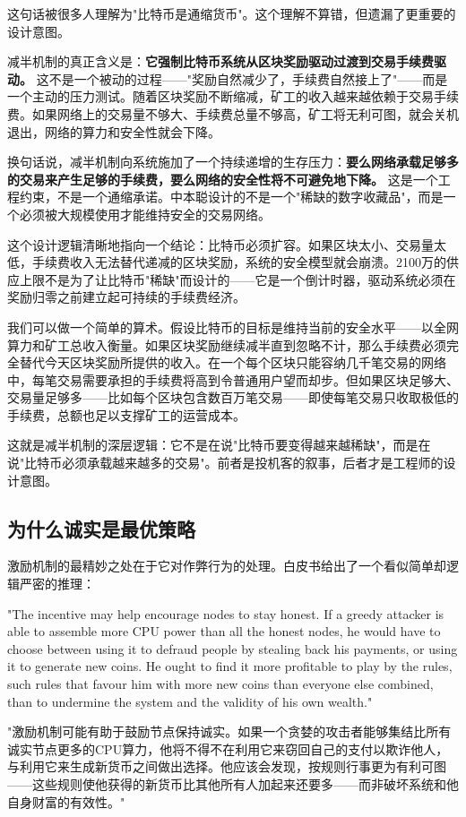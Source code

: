 \documentclass[a4paper,12pt,openany]{ctexbook}
\newenvironment{quoting}{%
  \par\vspace{0.5em}%
  \begin{list}{}{%
    \setlength{\leftmargin}{2em}%
    \setlength{\rightmargin}{2em}%
    \setlength{\parsep}{0.3em}%
    \setlength{\itemsep}{0pt}%
    \setlength{\topsep}{0pt}%
  }%
  \item\relax
}{%
  \end{list}%
  \par\vspace{0.5em}%
}
\begin{document}
这句话被很多人理解为"比特币是通缩货币"。这个理解不算错，但遗漏了更重要的设计意图。

减半机制的真正含义是：\textbf{它强制比特币系统从区块奖励驱动过渡到交易手续费驱动。} 这不是一个被动的过程——"奖励自然减少了，手续费自然接上了"——而是一个主动的压力测试。随着区块奖励不断缩减，矿工的收入越来越依赖于交易手续费。如果网络上的交易量不够大、手续费总量不够高，矿工将无利可图，就会关机退出，网络的算力和安全性就会下降。

换句话说，减半机制向系统施加了一个持续递增的生存压力：\textbf{要么网络承载足够多的交易来产生足够的手续费，要么网络的安全性将不可避免地下降。} 这是一个工程约束，不是一个通缩承诺。中本聪设计的不是一个"稀缺的数字收藏品"，而是一个必须被大规模使用才能维持安全的交易网络。

这个设计逻辑清晰地指向一个结论：比特币必须扩容。如果区块太小、交易量太低，手续费收入无法替代递减的区块奖励，系统的安全模型就会崩溃。2100万的供应上限不是为了让比特币"稀缺"而设计的——它是一个倒计时器，驱动系统必须在奖励归零之前建立起可持续的手续费经济。

我们可以做一个简单的算术。假设比特币的目标是维持当前的安全水平——以全网算力和矿工总收入衡量。如果区块奖励继续减半直到忽略不计，那么手续费必须完全替代今天区块奖励所提供的收入。在一个每个区块只能容纳几千笔交易的网络中，每笔交易需要承担的手续费将高到令普通用户望而却步。但如果区块足够大、交易量足够多——比如每个区块包含数百万笔交易——即使每笔交易只收取极低的手续费，总额也足以支撑矿工的运营成本。

这就是减半机制的深层逻辑：它不是在说"比特币要变得越来越稀缺"，而是在说"比特币必须承载越来越多的交易"。前者是投机客的叙事，后者才是工程师的设计意图。


\subsection*{为什么诚实是最优策略}


激励机制的最精妙之处在于它对作弊行为的处理。白皮书给出了一个看似简单却逻辑严密的推理：


\begin{quoting}
\small
"The incentive may help encourage nodes to stay honest. If a greedy attacker is able to assemble more CPU power than all the honest nodes, he would have to choose between using it to defraud people by stealing back his payments, or using it to generate new coins. He ought to find it more profitable to play by the rules, such rules that favour him with more new coins than everyone else combined, than to undermine the system and the validity of his own wealth."

"激励机制可能有助于鼓励节点保持诚实。如果一个贪婪的攻击者能够集结比所有诚实节点更多的CPU算力，他将不得不在利用它来窃回自己的支付以欺诈他人，与利用它来生成新货币之间做出选择。他应该会发现，按规则行事更为有利可图——这些规则使他获得的新货币比其他所有人加起来还要多——而非破坏系统和他自身财富的有效性。"
\end{quoting}
\end{document}
